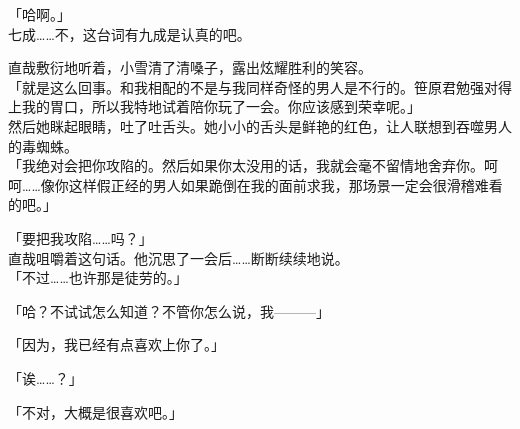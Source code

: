 「哈啊。」\\

七成……不，这台词有九成是认真的吧。

直哉敷衍地听着，小雪清了清嗓子，露出炫耀胜利的笑容。\\

「就是这么回事。和我相配的不是与我同样奇怪的男人是不行的。笹原君勉强对得上我的胃口，所以我特地试着陪你玩了一会。你应该感到荣幸呢。」\\

然后她眯起眼睛，吐了吐舌头。她小小的舌头是鲜艳的红色，让人联想到吞噬男人的毒蜘蛛。\\

「我绝对会把你攻陷的。然后如果你太没用的话，我就会毫不留情地舍弃你。呵呵……像你这样假正经的男人如果跪倒在我的面前求我，那场景一定会很滑稽难看的吧。」

「要把我攻陷……吗？」\\

直哉咀嚼着这句话。他沉思了一会后……断断续续地说。\\

「不过……也许那是徒劳的。」

「哈？不试试怎么知道？不管你怎么说，我———」

「因为，我已经有点喜欢上你了。」

「诶……？」

「不对，大概是很喜欢吧。」

